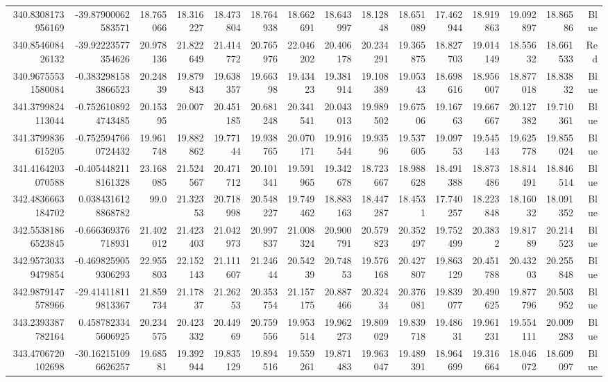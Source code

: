 \begin{center}
\begin{longtable}{rrrrrrrrrrrrrrr}
340.8308173956169 & -39.87900062583571 & 18.765066 & 18.316227 & 18.473804 & 18.764938 & 18.662691 & 18.643997 & 18.12848 & 18.651089 & 17.462944 & 18.919863 & 19.092897 & 18.86586 & Blue \\
340.854608426132 & -39.92223577354626 & 20.978136 & 21.822649 & 21.414772 & 20.765976 & 22.046202 & 20.406178 & 20.234291 & 19.365875 & 18.827703 & 19.014149 & 18.55632 & 18.661533 & Red \\
340.96755531580084 & -0.3832981583866523 & 20.24839 & 19.879843 & 19.638357 & 19.66398 & 19.43423 & 19.381914 & 19.108389 & 19.05343 & 18.698616 & 18.956007 & 18.877018 & 18.83832 & Blue \\
341.3799824113044 & -0.7526108924743485 & 20.15395 & 20.007 & 20.451185 & 20.681248 & 20.341541 & 20.043013 & 19.989502 & 19.67506 & 19.16763 & 19.667667 & 20.127382 & 19.710361 & Blue \\
341.3799836615205 & -0.7525947660724432 & 19.961748 & 19.882862 & 19.77144 & 19.938765 & 20.070171 & 19.916544 & 19.93596 & 19.537605 & 19.09753 & 19.545143 & 19.625778 & 19.855024 & Blue \\
341.4164203070588 & -0.4054482118161328 & 23.168085 & 21.524567 & 20.471712 & 20.101341 & 19.591965 & 19.342678 & 18.723667 & 18.988628 & 18.491388 & 18.873486 & 18.814491 & 18.846514 & Blue \\
342.4836663184702 & 0.0384316128868782 & 99.0 & 21.32353 & 20.718998 & 20.548227 & 19.749462 & 18.883163 & 18.447287 & 18.4531 & 17.740257 & 18.223848 & 18.16032 & 18.091352 & Blue \\
342.55381866523845 & -0.666369376718931 & 21.402012 & 21.423403 & 21.042973 & 20.997837 & 21.008324 & 20.900791 & 20.579823 & 20.352497 & 19.752499 & 20.3832 & 19.81789 & 20.214523 & Blue \\
342.95730339479854 & -0.4698259059306293 & 22.955803 & 22.152143 & 21.111607 & 21.24644 & 20.54239 & 20.74853 & 19.576168 & 20.427807 & 19.863129 & 20.451788 & 20.43203 & 20.255848 & Blue \\
342.9879147578966 & -29.414118119813367 & 21.859734 & 21.17837 & 21.26253 & 20.353754 & 21.157175 & 20.887466 & 20.32434 & 20.376081 & 19.839077 & 20.490625 & 19.877796 & 20.503952 & Blue \\
343.2393387782164 & 0.4587823345606925 & 20.234575 & 20.423332 & 20.44969 & 20.759556 & 19.953514 & 19.962273 & 19.809029 & 19.839718 & 19.48631 & 19.961231 & 19.554111 & 20.009283 & Blue \\
343.4706720102698 & -30.162151096626257 & 19.68581 & 19.392944 & 19.835129 & 19.894516 & 19.559261 & 19.871483 & 19.963047 & 19.489391 & 18.964699 & 19.316664 & 18.046072 & 18.609097 & Blue \\

\end{longtable}
\end{center}
